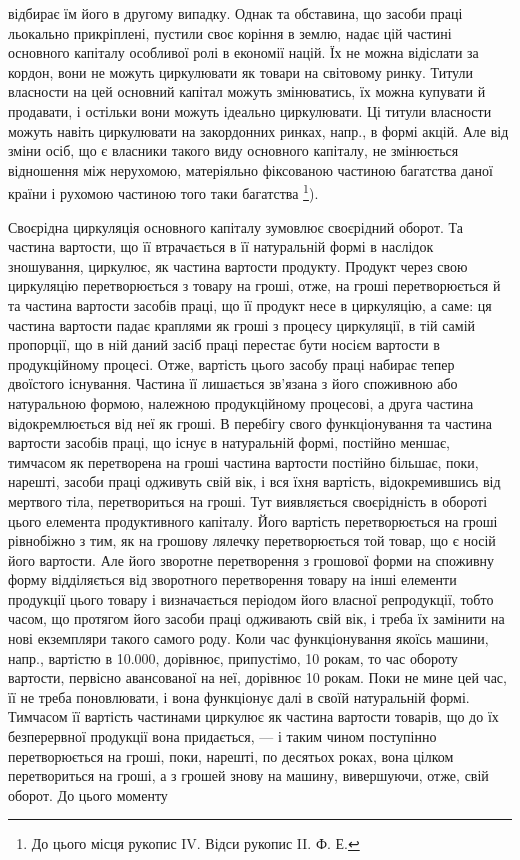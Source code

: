 \parcont{}  %
відбирає їм його в другому випадку. Однак та обставина, що засоби праці льокально прикріплені,
пустили своє коріння в землю, надає цій частині основного капіталу особливої ролі в економії націй.
Їх не можна відіслати за кордон, вони не можуть циркулювати як товари на світовому ринку. Титули
власности на цей основний капітал можуть змінюватись, їх можна купувати й продавати, і остільки вони
можуть ідеально
циркулювати. Ці титули власности можуть навіть циркулювати на закордонних ринках, напр., в формі
акцій. Але від зміни осіб, що є власники такого виду основного капіталу, не змінюється відношення
між нерухомою, матеріяльно фіксованою частиною багатства даної країни і рухомою частиною того таки
багатства \footnote{До цього місця рукопис IV. Відси рукопис II. Ф. Е.}).

Своєрідна циркуляція основного капіталу зумовлює своєрідний оборот. Та частина вартости, що її
втрачається в її натуральній формі в наслідок зношування, циркулює, як частина вартости продукту.
Продукт через свою циркуляцію перетворюється з товару на гроші, отже, на гроші перетворюється й та
частина вартости засобів праці, що її продукт несе в циркуляцію, а саме: ця частина вартости падає
краплями як гроші з процесу циркуляції, в тій самій пропорції, що в ній даний засіб праці перестає
бути носієм вартости в продукційному процесі. Отже, вартість цього засобу праці набирає тепер
двоїстого існування. Частина її лишається зв’язана з його споживною або натуральною формою, належною
продукційному процесові, а друга частина відокремлюється від неї як гроші. В перебігу свого
функціонування та частина вартости засобів праці, що існує в натуральній формі, постійно меншає,
тимчасом як перетворена на гроші частина вартости постійно більшає, поки, нарешті, засоби праці
одживуть свій вік, і вся їхня вартість, відокремившись від мертвого тіла, перетвориться на гроші.
Тут виявляється своєрідність в обороті цього елемента продуктивного капіталу. Його вартість
перетворюється на гроші рівнобіжно з тим, як на грошову лялечку перетворюється той товар, що є носій
його вартости. Але його зворотне перетворення з грошової форми на споживну форму відділяється від
зворотного перетворення товару на інші елементи продукції цього товару і визначається періодом його
власної репродукції, тобто часом, що протягом його засоби праці одживають свій вік, і треба їх
замінити на нові екземпляри такого самого роду. Коли час функціонування якоїсь машини, напр.,
вартістю в \num{10.000}, дорівнює, припустімо, 10 рокам, то час обороту вартости, первісно
авансованої на неї, дорівнює 10 рокам. Поки не мине цей час, її не треба поновлювати, і вона
функціонує далі в своїй натуральній формі. Тимчасом її вартість частинами циркулює як частина
вартости товарів, що до їх безперервної продукції вона придається, — і таким чином поступінно
перетворюється на гроші, поки, нарешті, по десятьох роках, вона цілком перетвориться на гроші, а з
грошей знову на машину, вивершуючи, отже, свій оборот. До цього моменту
\parbreak{}  %
